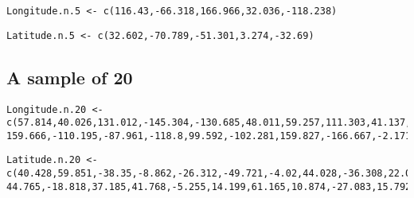 \documentclass[letterpaper,9pt,twoside,printwatermark=false]{pinp}
\begin{document}
\begin{ShadedResult}
\begin{verbatim}
Longitude.n.5 <- c(116.43,-66.318,166.966,32.036,-118.238)
\end{verbatim}
\end{ShadedResult}\begin{ShadedResult}
\begin{verbatim}
Latitude.n.5 <- c(32.602,-70.789,-51.301,3.274,-32.69)
\end{verbatim}
\end{ShadedResult}

\subsection*{A sample of 20}\label{a-sample-of-20}

\begin{ShadedResult}
\begin{verbatim}
Longitude.n.20 <- c(57.814,40.026,131.012,-145.304,-130.685,48.011,59.257,111.303,41.137,-61.05,
159.666,-110.195,-87.961,-118.8,99.592,-102.281,159.827,-166.667,-2.171,-6.664)
\end{verbatim}
\end{ShadedResult}\begin{ShadedResult}
\begin{verbatim}
Latitude.n.20 <- c(40.428,59.851,-38.35,-8.862,-26.312,-49.721,-4.02,44.028,-36.308,22.071,
44.765,-18.818,37.185,41.768,-5.255,14.199,61.165,10.874,-27.083,15.792)
\end{verbatim}
\end{ShadedResult}





\end{document}

